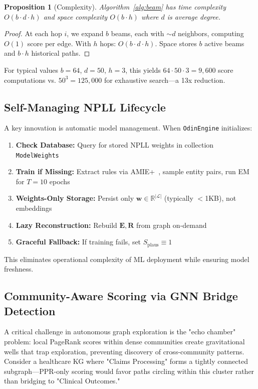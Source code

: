 \documentclass[10pt,twocolumn]{article}
\newtheorem{proposition}{Proposition}
\begin{document}
\begin{proposition}[Complexity]
Algorithm~\ref{alg:beam} has time complexity $O(b \cdot d \cdot h)$ and space complexity $O(b \cdot h)$ where $d$ is average degree.
\end{proposition}

\begin{proof}
At each hop $i$, we expand $b$ beams, each with $\sim d$ neighbors, computing $O(1)$ score per edge. With $h$ hops: $O(b \cdot d \cdot h)$. Space stores $b$ active beams and $b \cdot h$ historical paths.
\end{proof}

For typical values $b=64$, $d=50$, $h=3$, this yields $64 \cdot 50 \cdot 3 = 9,600$ score computations vs. $50^3 = 125,000$ for exhaustive search---a 13x reduction.

\subsection{Self-Managing NPLL Lifecycle}

A key innovation is automatic model management. When \texttt{OdinEngine} initializes:

\begin{enumerate}
\item \textbf{Check Database:} Query for stored NPLL weights in collection \texttt{ModelWeights}
\item \textbf{Train if Missing:} Extract rules via AMIE+~\cite{galarraga2015fast}, sample entity pairs, run EM for $T=10$ epochs
\item \textbf{Weights-Only Storage:} Persist only $\mathbf{w} \in \mathbb{R}^{|\mathcal{L}|}$ (typically $<$1KB), not embeddings
\item \textbf{Lazy Reconstruction:} Rebuild $\mathbf{E}, \mathbf{R}$ from graph on-demand
\item \textbf{Graceful Fallback:} If training fails, set $S_{\text{plaus}} \equiv 1$
\end{enumerate}

This eliminates operational complexity of ML deployment while ensuring model freshness.

\subsection{Community-Aware Scoring via GNN Bridge Detection}

A critical challenge in autonomous graph exploration is the "echo chamber" problem: local PageRank scores within dense communities create gravitational wells that trap exploration, preventing discovery of cross-community patterns. Consider a healthcare KG where "Claims Processing" forms a tightly connected subgraph—PPR-only scoring would favor paths circling within this cluster rather than bridging to "Clinical Outcomes."
\end{document}
